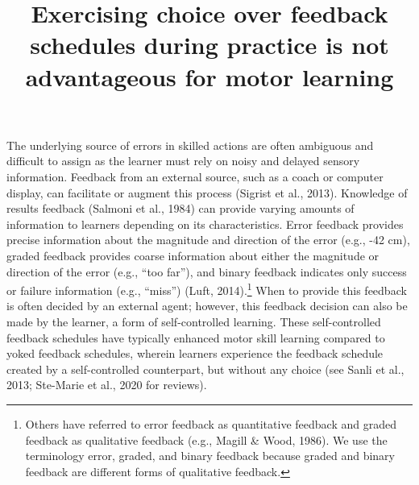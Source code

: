 \documentclass[
  man, donotrepeattitle,floatsintext]{apa7}
\title{Exercising choice over feedback schedules during practice is not advantageous for motor learning}
\author{\phantom{0}}
\date{}
\affiliation{\phantom{0}}
\begin{document}
\maketitle

The underlying source of errors in skilled actions are often ambiguous and difficult to assign as the learner must rely on noisy and delayed sensory information. Feedback from an external source, such as a coach or computer display, can facilitate or augment this process (Sigrist et al., 2013). Knowledge of results feedback (Salmoni et al., 1984) can provide varying amounts of information to learners depending on its characteristics. Error feedback provides precise information about the magnitude and direction of the error (e.g., -42 cm), graded feedback provides coarse information about either the magnitude or direction of the error (e.g., ``too far''), and binary feedback indicates only success or failure information (e.g., ``miss'') (Luft, 2014).\footnote{Others have referred to error feedback as quantitative feedback and graded feedback as qualitative feedback (e.g., Magill \& Wood, 1986). We use the terminology error, graded, and binary feedback because graded and binary feedback are different forms of qualitative feedback.} When to provide this feedback is often decided by an external agent; however, this feedback decision can also be made by the learner, a form of self-controlled learning. These self-controlled feedback schedules have typically enhanced motor skill learning compared to yoked feedback schedules, wherein learners experience the feedback schedule created by a self-controlled counterpart, but without any choice (see Sanli et al., 2013; Ste-Marie et al., 2020 for reviews).
\end{document}
